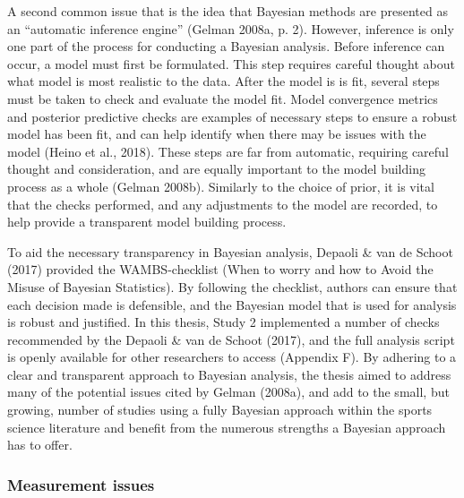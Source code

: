 \documentclass[man,floatsintext]{apa6}
\begin{document}
A second common issue that is the idea that Bayesian methods are presented as an \enquote{automatic inference engine} (Gelman 2008a, p. 2).
However, inference is only one part of the process for conducting a Bayesian analysis.
Before inference can occur, a model must first be formulated.
This step requires careful thought about what model is most realistic to the data.
After the model is is fit, several steps must be taken to check and evaluate the model fit.
Model convergence metrics and posterior predictive checks are examples of necessary steps to ensure a robust model has been fit, and can help identify when there may be issues with the model (Heino et al., 2018).
These steps are far from automatic, requiring careful thought and consideration, and are equally important to the model building process as a whole (Gelman 2008b).
Similarly to the choice of prior, it is vital that the checks performed, and any adjustments to the model are recorded, to help provide a transparent model building process.

To aid the necessary transparency in Bayesian analysis, Depaoli \& van de Schoot (2017) provided the WAMBS-checklist (When to worry and how to Avoid the Misuse of Bayesian Statistics).
By following the checklist, authors can ensure that each decision made is defensible, and the Bayesian model that is used for analysis is robust and justified.
In this thesis, Study 2 implemented a number of checks recommended by the Depaoli \& van de Schoot (2017), and the full analysis script is openly available for other researchers to access (Appendix F).
By adhering to a clear and transparent approach to Bayesian analysis, the thesis aimed to address many of the potential issues cited by Gelman (2008a), and add to the small, but growing, number of studies using a fully Bayesian approach within the sports science literature and benefit from the numerous strengths a Bayesian approach has to offer.

\hypertarget{measurement-issues-1}{%
\subsubsection{Measurement issues}\label{measurement-issues-1}}
\end{document}
